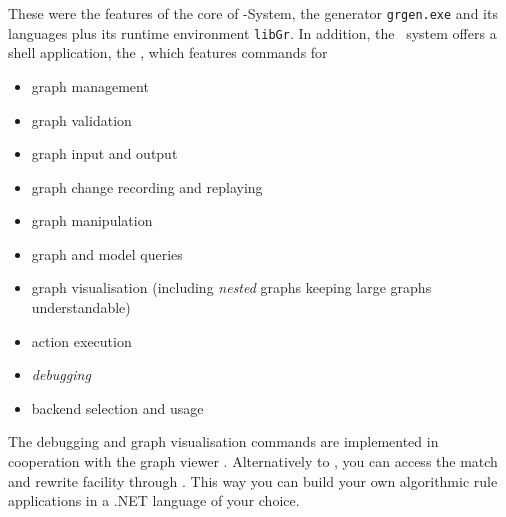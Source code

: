 \noindent These were the features of the core of \GrG-System, 
the generator \texttt{grgen.exe} and its languages plus its runtime environment \texttt{libGr}.
In addition, the \GrG\ system offers a shell application, the \GrShell, 
which features commands for
\begin{itemize}
	\item graph management
	\item graph validation
	\item graph input and output
	\item graph change recording and replaying
	\item graph manipulation
	\item graph and model queries
	\item graph visualisation (including \emph{nested} graphs keeping large graphs understandable)
	\item action execution
	\item \emph{debugging}
	\item backend selection and usage
\end{itemize}

\noindent The debugging and graph visualisation commands are implemented in cooperation with the graph viewer \yComp.
Alternatively to \GrShell, you can access the match and rewrite facility through \LibGr. 
This way you can build your own algorithmic rule applications in a .NET language of your choice. 

